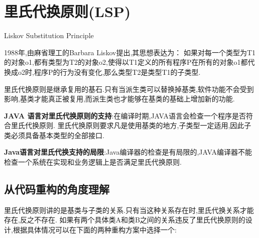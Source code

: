 \documentclass[../main.tex]{subfiles}
\begin{document}
\section{里氏代换原则(LSP)}
Liskov Substitution Principle

\noindent 1988年,由麻省理工的Barbara Liskov提出,其思想表达为：
如果对每一个类型为T1的对象o1,都有类型为T2的对象o2,使得以T1定义的所有程序P在所有的对象o1都代换成o2时,程序P的行为没有变化,那么类型T2是类型T1的子类型.

\noindent 里氏代换原则是继承复用的基石.只有当派生类可以替换掉基类,软件功能不会受到影响,基类才能真正被复用,而派生类也才能够在基类的基础上增加新的功能.

\textbf{JAVA 语言对里氏代换原则的支持}:在编译时期,JAVA语言会检查一个程序是否符合里氏代换原则.
里氏代换原则要求凡是使用基类的地方,子类型一定适用,因此子类必须具备基本类型的全部接口.

\noindent \textbf{Java语言对里氏代换支持的局限}:Java编译器的检查是有局限的,JAVA编译器不能检查一个系统在实现和业务逻辑上是否满足里氏代换原则.

\subsection{从代码重构的角度理解}
里氏代换原则讲的是基类与子类的关系.只有当这种关系存在时,里氏代换关系才能存在,反之不存在.
如果有两个具体类A和类B之间的关系违反了里氏代换原则的设计,根据具体情况可以在下面的两种重构方案中选择一个:
\end{document}
